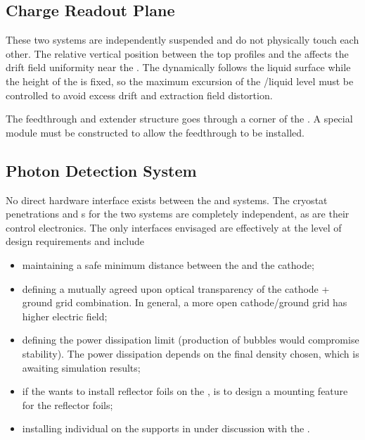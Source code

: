 
\subsection{Charge Readout Plane}
\label{sec:fddp-hv-intfc-to-crp}

These two systems are independently suspended and do not physically touch each other.  The relative vertical position between the top  profiles and the  affects the drift field uniformity near the .  The   dynamically follows the liquid surface while the height of the  is fixed, so the maximum excursion of the /liquid level must be controlled to avoid excess drift and extraction field distortion.

The  feedthrough and extender structure goes through a corner of the .  A special  module must be constructed to allow the  feedthrough to be installed.


\subsection{Photon Detection System}
\label{sec:fddp-hv-intfc-to-pds}

No direct hardware interface exists between the  and  systems. The cryostat penetrations and \fdth{}s for the two systems are completely independent, as are their control electronics. The only interfaces envisaged are effectively at the level of design requirements and include 
\begin{itemize}
    \item maintaining a safe minimum distance between the  and the \dptargetdriftvoltneg cathode;
    \item defining a mutually agreed upon optical transparency of the cathode + ground grid combination.  In general, a more open cathode/ground grid has higher electric field;
    \item  defining the  power dissipation limit (production of bubbles would compromise  stability). The power dissipation depends on the final  density chosen, which is awaiting simulation results;
    \item if the  wants to install reflector foils on the ,  is to design a mounting feature for the reflector foils;
    \item installing individual  on the  supports in under discussion with the .
\end{itemize}


